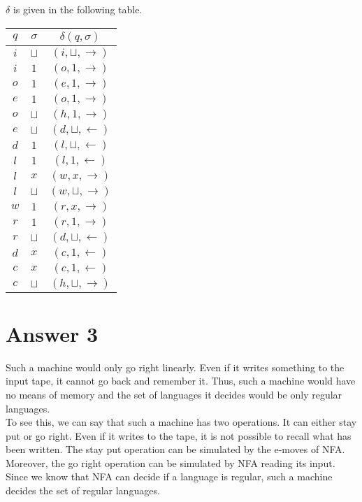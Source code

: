 \documentclass[12pt]{article}
\begin{document}
$\delta$ is given in the following table.
\begin{table}[H]
    \centering
    \begin{tabular}{c|c|c}
         $q$    &$\sigma$   &$\delta(q,\sigma)$\\\hline
         $i$    &$\sqcup$   & $(i,\sqcup, \rightarrow)$\\
         $i$    &$1$        &$(o,1,\rightarrow)$\\
         $o$    &$1$        &$(e,1,\rightarrow)$\\
         $e$    &$1$        &$(o,1,\rightarrow)$\\
         $o$    &$\sqcup$   &$(h,1,\rightarrow)$\\
         $e$    &$\sqcup$   &$(d,\sqcup,\leftarrow)$\\
         $d$    &$1$        &$(l,\sqcup,\leftarrow)$\\
         $l$    &$1$        &$(l,1,\leftarrow)$\\
         $l$    &$x$        &$(w,x,\rightarrow)$\\
         $l$    &$\sqcup$   &$(w,\sqcup,\rightarrow)$\\
         $w$    &$1$        &$(r,x,\rightarrow)$\\
         $r$    &$1$        &$(r,1,\rightarrow)$\\
         $r$    &$\sqcup$   &$(d,\sqcup,\leftarrow)$\\
         $d$    &$x$        &$(c, 1, \leftarrow)$\\
         $c$    &$x$        &$(c, 1, \leftarrow)$\\
         $c$    &$\sqcup$   &$(h, \sqcup,\rightarrow)$
    \end{tabular}
\end{table}
\section*{Answer 3}
Such a machine would only go right linearly. Even if it writes something to the input tape, it cannot go back and remember it. Thus, such a machine would have no means of memory and the set of languages it decides would be only regular languages.\\
To see this, we can say that such a machine has two operations. It can either stay put or go right. Even if it writes to the tape, it is not possible to recall what has been written. The stay put operation can be simulated by the e-moves of NFA. Moreover, the go right operation can be simulated by NFA reading its input. Since we know that NFA can decide if a language is regular, such a machine decides the set of regular languages.
\end{document}
